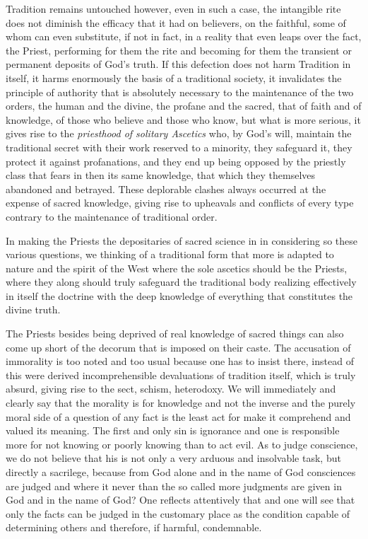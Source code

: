 Tradition remains untouched however, even in such a case, the intangible rite does not diminish the efficacy that it had on believers, on the faithful, some of whom can even substitute, if not in fact, in a reality that even leaps over the fact, the Priest, performing for them the rite and becoming for them the transient or permanent deposits of God's truth. If this defection does not harm Tradition in itself, it harms enormously the basis of a traditional society, it invalidates the principle of authority that is absolutely necessary to the maintenance of the two orders, the human and the divine, the profane and the sacred, that of faith and of knowledge, of those who believe and those who know, but what is more serious, it gives rise to the \emph{priesthood of solitary Ascetics} who, by God's will, maintain the traditional secret with their work reserved to a minority, they safeguard it, they protect it against profanations, and they end up being opposed by the priestly class that fears in then its same knowledge, that which they themselves abandoned and betrayed. These deplorable clashes always occurred at the expense of sacred knowledge, giving rise to upheavals and conflicts of every type contrary to the maintenance of traditional order.

In making the Priests the depositaries of sacred science in in considering so these various questions, we thinking of a traditional form that more is adapted to nature and the spirit of the West where the sole ascetics should be the Priests, where they along should truly safeguard the traditional body realizing effectively in itself the doctrine with the deep knowledge of everything that constitutes the divine truth.

The Priests besides being deprived of real knowledge of sacred things can also come up short of the decorum that is imposed on their caste. The accusation of immorality is too noted and too usual because one has to insist there, instead of this were derived incomprehensible devaluations of tradition itself, which is truly absurd, giving rise to the sect, schism, heterodoxy. We will immediately and clearly say that the morality is for knowledge and not the inverse and the purely moral side of a question of any fact is the least act for make it comprehend and valued its meaning. The first and only sin is ignorance and one is responsible more for not knowing or poorly knowing than to act evil. As to judge conscience, we do not believe that his is not only a very arduous and insolvable task, but directly a sacrilege, because from God alone and in the name of God consciences are judged and where it never than the so called more judgments are given in God and in the name of God? One reflects attentively that and one will see that only the facts can be judged in the customary place as the condition capable of determining others and therefore, if harmful, condemnable.

